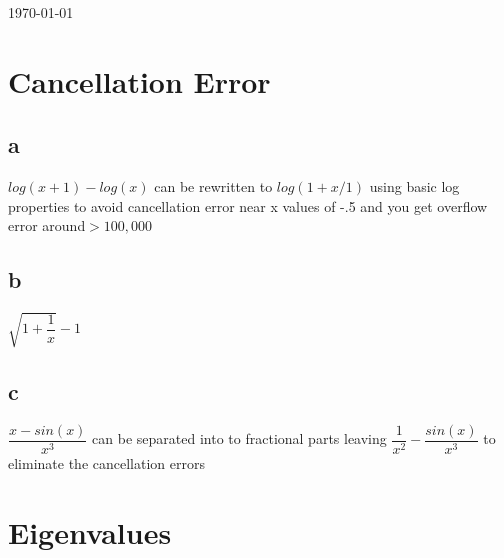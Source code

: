 \documentclass[letterpaper,12pt]{article}
\begin{document}
\begin{titlepage}

{\large \today}\\[3cm] %


 

\vfill %

\end{titlepage}



\section{Cancellation Error} 

\subsection*{a} $log(x+1)-log(x)$ can be rewritten to $log(1+x/1)$ using basic log properties to avoid cancellation error near x values of -.5 and you get overflow error around$>100,000$
\subsection*{b}$\sqrt{1+\dfrac{1}{x}}-1$
\subsection*{c}$\dfrac{x-sin(x)}{x^3}$ can be separated into to fractional parts leaving $\dfrac{1}{x^2} - \dfrac{sin(x)}{x^3}$ to eliminate the cancellation errors

\section{Eigenvalues}
\end{document}
